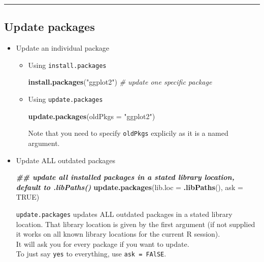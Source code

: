 \documentclass[
]{book}
\newenvironment{Shaded}{\begin{snugshade}}{\end{snugshade}}
\newcommand{\AttributeTok}[1]{\textcolor[rgb]{0.13,0.29,0.53}{#1}}
\newcommand{\CommentTok}[1]{\textcolor[rgb]{0.56,0.35,0.01}{\textit{#1}}}
\newcommand{\ConstantTok}[1]{\textcolor[rgb]{0.56,0.35,0.01}{#1}}
\newcommand{\DocumentationTok}[1]{\textcolor[rgb]{0.56,0.35,0.01}{\textbf{\textit{#1}}}}
\newcommand{\FunctionTok}[1]{\textcolor[rgb]{0.13,0.29,0.53}{\textbf{#1}}}
\newcommand{\NormalTok}[1]{#1}
\newcommand{\StringTok}[1]{\textcolor[rgb]{0.31,0.60,0.02}{#1}}
\theoremstyle{definition}
\theoremstyle{definition}
\theoremstyle{definition}
\theoremstyle{definition}
\theoremstyle{remark}
\begin{document}
\begin{center}\rule{0.5\linewidth}{0.5pt}\end{center}

\subsection{Update packages}\label{update-packages}

\begin{itemize}
\item
  Update an individual package

  \begin{itemize}
  \item
    Using \texttt{install.packages}

\begin{Shaded}
\begin{Highlighting}[]
\FunctionTok{install.packages}\NormalTok{(}\StringTok{"ggplot2"}\NormalTok{) }\CommentTok{\# update one specific package}
\end{Highlighting}
\end{Shaded}
  \item
    Using \texttt{update.packages}

\begin{Shaded}
\begin{Highlighting}[]
\FunctionTok{update.packages}\NormalTok{(}\AttributeTok{oldPkgs =} \StringTok{"ggplot2"}\NormalTok{)}
\end{Highlighting}
\end{Shaded}

    Note that you need to {specify \texttt{oldPkgs} explicily} as it is a named argument.
  \end{itemize}
\item
  Update ALL outdated packages

\begin{Shaded}
\begin{Highlighting}[]
\DocumentationTok{\#\# update all installed packages in a stated library location, default to \textasciigrave{}.libPaths()\textasciigrave{}}
\FunctionTok{update.packages}\NormalTok{(}\AttributeTok{lib.loc =} \FunctionTok{.libPaths}\NormalTok{(), }\AttributeTok{ask =} \ConstantTok{TRUE}\NormalTok{) }
\end{Highlighting}
\end{Shaded}

  \texttt{update.packages} updates ALL outdated packages in a stated library location. That library location is given by the first argument (if not supplied it works on all known library locations for the current R session).\\
  It will ask you for every package if you want to update.\\
  To just say \texttt{yes} to everything, use \texttt{ask\ =\ FAlSE}.


\end{itemize}
\end{document}
